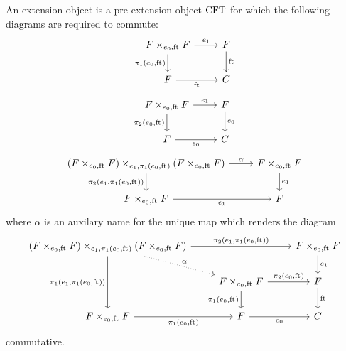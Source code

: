 \begin{defn} An extension object is a pre-extension object $\mathrm{CFT}$ for which 
the following diagrams are required to commute:
\begin{equation*}
\begin{tikzcd}
\stesysff 
  \ar{r}{\efamext} 
  \ar{d}[swap]{\pullbackpr{1}{\ectxext}{\eft}} 
  & 
\stesysf 
  \ar{d}{\eft}
  \\
\stesysf
  \ar{r}[swap]{\eft} 
  & 
\stesysc
\end{tikzcd}
\end{equation*}
\begin{equation*}
\begin{tikzcd}
\stesysff 
  \ar{d}[swap]{\pullbackpr{2}{\ectxext}{\eft}} 
  \ar{r}{\efamext} 
  & 
\stesysf 
  \ar{d}{\ectxext}
  \\
\stesysf 
  \ar{r}[swap]{\ectxext} 
  & 
\stesysc
\end{tikzcd}
\end{equation*}
\begin{equation*}
\begin{tikzcd}
\pullback{\stesysff}{\stesysff}{\efamext}{\pullbackpr{1}{\ectxext}{\eft}} 
  \ar{d}[swap]{\pullbackpr{2}{\efamext}{\pullbackpr{1}{\ectxext}{\eft}}}
  \ar{r}{\alpha}
  & 
\stesysff 
  \ar{d}{\efamext} 
  \\
\stesysff 
  \ar{r}[swap]{\efamext} 
  &
\stesysf
\end{tikzcd}
\end{equation*}
where $\alpha$ is an auxilary name for the unique map which renders the diagram
\begin{equation*}
\begin{tikzcd}
\pullback{\stesysff}{\stesysff}{\efamext}{\pullbackpr{1}{\ectxext}{\eft}}
  \ar[dotted]{dr}{\alpha}
  \ar{rr}{\pullbackpr{2}{\efamext}{\pullbackpr{1}{\ectxext}{\eft}}}
  \ar{dd}[swap]{\pullbackpr{1}{\efamext}{\pullbackpr{1}{\ectxext}{\eft}}}
  & 
  &
\stesysff
  \ar{d}{\efamext}
  \\
  &
\stesysff
  \ar{d}[swap]{\pullbackpr{1}{\ectxext}{\eft}}
  \ar{r}{\pullbackpr{2}{\ectxext}{\eft}}
  &
\stesysf
  \ar{d}{\eft}
  \\
\stesysff
  \ar{r}[swap]{\pullbackpr{1}{\ectxext}{\eft}}
  &
\stesysf
  \ar{r}[swap]{\ectxext}
  &
\stesysc
\end{tikzcd}
\end{equation*}
commutative.
\end{defn}

